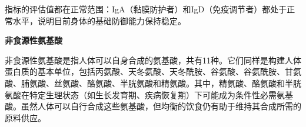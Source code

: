 \documentclass[UTF8]{ctexart}
\begin{document}
\begin{center}
\end{center}

\begin{tcolorbox}[
    enhanced,
    colback=gray!3,
    colframe=gray!3,
    arc=3mm,
    boxrule=0pt,
    width=\textwidth,
    top=8pt,
    bottom=8pt
]
{\small{\textcolor{green!85!orange}{\faLightbulb}}\quad 指标的评估值都在正常范围：IgA（黏膜防护者）和IgD（免疫调节者）都处于正常水平，说明目前身体的基础防御能力保持稳定。
}

\end{tcolorbox}

\newpage

\begin{tcolorbox}[
    enhanced,
    colback=blue!3,
    colframe=gray!3,
    arc=3mm,
    boxrule=0pt,
    width=\textwidth,
    top=8pt,
    bottom=8pt
]
{\large \textbf{非食源性氨基酸}}

\vspace{0.1cm}
{\small {\color{customTeal}\faInfoCircle} 非食源性氨基酸是指人体可以自身合成的氨基酸，共有11种。它们同样是构建人体蛋白质的基本单位，包括丙氨酸、天冬氨酸、天冬酰胺、谷氨酸、谷氨酰胺、甘氨酸、脯氨酸、丝氨酸、酪氨酸、半胱氨酸和精氨酸。其中，精氨酸、酪氨酸和半胱氨酸在特定生理状态（如生长发育期、疾病恢复期）下可能成为条件性必需氨基酸。虽然人体可以自行合成这些氨基酸，但均衡的饮食仍有助于维持其合成所需的原料供应。}
\end{tcolorbox}

\newpage
\end{document}
